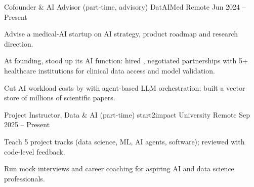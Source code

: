
\begin{cventries}

  \joborrole
    {Cofounder \& AI Advisor (part-time, advisory)}
    {DatAIMed}
    {Remote}
    {Jun 2024 -- Present}
    {
      \item Advise a medical-AI startup on AI strategy, product roadmap and research direction.
      \item At founding, stood up its AI function: hired , negotiated partnerships with 5+ healthcare institutions for clinical data access and model validation.
      \item Cut AI workload costs by  with agent-based LLM orchestration; built a vector store of millions of scientific papers.
    }

  \joborrole
    {Project Instructor, Data \& AI (part-time)}
    {start2impact University}
    {Remote}
    {Sep 2025 -- Present}
    {
      \item Teach 5 project tracks (data science, ML, AI agents, software); reviewed  with code-level feedback.
      \item Run mock interviews and career coaching for aspiring AI and data science professionals.
    }

\end{cventries}
